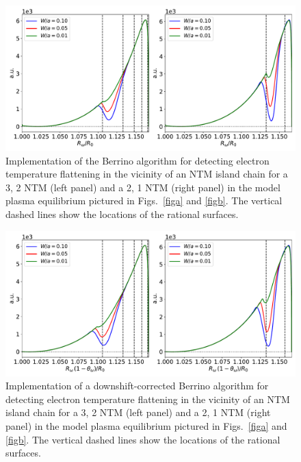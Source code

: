 \documentclass[12pt,prb,aps]{revtex4-1}
\begin{document}
\begin{figure}
\centerline{\includegraphics[width=\textwidth]{Fig17.pdf}}
\caption{Implementation of the Berrino algorithm for detecting electron temperature flattening  in the vicinity of an NTM island chain  for a 3, 2  NTM (left panel) and a 2, 1 NTM (right panel) in the model plasma equilibrium pictured in Figs.~\ref{figa} and \ref{figb}. The vertical dashed lines show the locations of the rational surfaces. \label{fig15}}
\end{figure}

\begin{figure}
\centerline{\includegraphics[width=\textwidth]{Fig18.pdf}}
\caption{Implementation of a downshift-corrected  Berrino algorithm for detecting electron temperature flattening  in the vicinity of an NTM island chain  for a 3, 2  NTM (left panel) and a 2, 1 NTM (right panel) in the model plasma equilibrium pictured in Figs.~\ref{figa} and \ref{figb}. The vertical dashed lines show the locations of the rational surfaces. \label{fig16}}
\end{figure}
\end{document}
